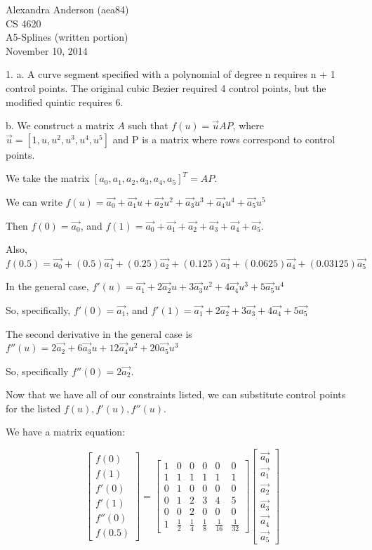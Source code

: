 \documentclass{letter}
\begin{document}
Alexandra Anderson (aea84) \\
CS 4620 \\
A5-Splines (written portion) \\
November 10, 2014

1. a. A curve segment specified with a polynomial of degree n requires n + 1 control points. The original cubic Bezier required 4 control points, but the modified quintic requires 6. 

b. We construct a matrix $A$ such that $f(u) = \vec{u}AP$, where $\vec{u} = [1, u, u^2, u^3, u^4, u^5]$ and P is a matrix where rows correspond to control points. 

We take the matrix $[a_0, a_1, a_2, a_3, a_4, a_5]^T = AP$.

We can write $f(u) = \vec{a_0} + \vec{a_1}u + \vec{a_2}u^2 + \vec{a_3}u^3 + \vec{a_4}u^4 + \vec{a_5}u^5$

Then $f(0) = \vec{a_0}$, and $f(1) = \vec{a_0} + \vec{a_1} + \vec{a_2} + \vec{a_3} + \vec{a_4} + \vec{a_5}$. 

Also, $f(0.5) =  \vec{a_0} + (0.5)\vec{a_1} + (0.25)\vec{a_2} + (0.125)\vec{a_3} + (0.0625)\vec{a_4} + (0.03125)\vec{a_5}$

In the general case, $f'(u) = \vec{a_1} + 2\vec{a_2}u + 3\vec{a_3}u^2 + 4\vec{a_4}u^3 + 5\vec{a_5}u^4$

So, specifically, $f'(0) = \vec{a_1}$, and $f'(1) = \vec{a_1} + 2\vec{a_2} + 3\vec{a_3} + 4\vec{a_4} + 5\vec{a_5}$

The second derivative in the general case is $f''(u) = 2\vec{a_2} + 6\vec{a_3}u + 12\vec{a_4}u^2 + 20\vec{a_5}u^3$

So, specifically $f''(0) = 2\vec{a_2}$. 

Now that we have all of our constraints listed, we can substitute control points for the listed $f(u), f'(u), f''(u)$. 

We have a matrix equation:

$$
\begin{bmatrix}
f(0) \\
f(1) \\
f'(0) \\
f'(1) \\
f''(0) \\
f(0.5)
\end{bmatrix}
=
\begin{bmatrix}
1 & 0 & 0 & 0 & 0 & 0 \\
1 & 1 & 1 & 1 & 1 & 1 \\
0 & 1 & 0 & 0 & 0 & 0 \\
0 & 1 & 2 & 3 & 4 & 5 \\
0 & 0 & 2 & 0 & 0 & 0 \\
1 & \frac{1}{2} & \frac{1}{4} & \frac{1}{8} & \frac{1}{16} & \frac{1}{32} 
\end{bmatrix}
\begin{bmatrix}
\vec{a_0} \\
\vec{a_1} \\
\vec{a_2} \\
\vec{a_3} \\
\vec{a_4} \\
\vec{a_5} 
\end{bmatrix}
$$
\end{document}
